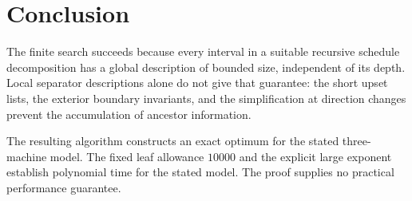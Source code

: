 \section{Conclusion}\label{sec:conclusion}

The finite search succeeds because every interval in a suitable recursive
schedule decomposition has a global description of bounded size,
independent of its depth. Local separator descriptions alone do not give
that guarantee: the short upset lists, the exterior boundary invariants,
and the simplification at direction changes prevent the accumulation of
ancestor information.

The resulting algorithm constructs an exact optimum for the stated
three-machine model. The fixed leaf allowance $10000$ and the explicit
large exponent establish polynomial time for the stated model.
The proof supplies no practical performance guarantee.
